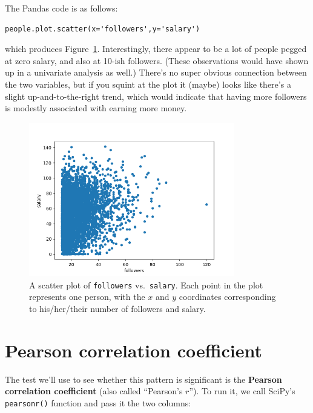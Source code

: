The Pandas code is as follows:

\begin{Verbatim}[fontsize=\small,samepage=true,frame=single,framesep=3mm]
people.plot.scatter(x='followers',y='salary')
\end{Verbatim}

which produces Figure~\ref{fig:followersSalary}. Interestingly, there appear to
be a lot of people pegged at zero salary, and also at 10-ish followers. (These
observations would have shown up in a univariate analysis as well.) There's no
super obvious connection between the two variables, but if you squint at the
plot it (maybe) looks like there's a slight up-and-to-the-right trend, which
would indicate that having more followers is modestly associated with earning
more money.

\begin{figure}[ht]
\centering
\includegraphics[width=0.8\textwidth]{followersSalary.png}
\caption{A scatter plot of \texttt{followers} vs.~\texttt{salary}. Each point
in the plot represents one person, with the $x$ and $y$ coordinates
corresponding to his/her/their number of followers and salary.}
\label{fig:followersSalary}
\end{figure}

\section{Pearson correlation coefficient}

The test we'll use to see whether this pattern is significant is the
\textbf{Pearson correlation coefficient} (also called ``Pearson's $r$''). To
run it, we call SciPy's \texttt{pearsonr()} function and pass it the two
columns:


